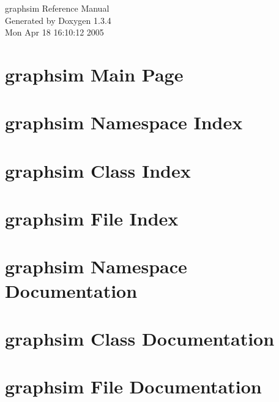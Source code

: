 \documentclass[a4paper]{book}
\begin{document}
\begin{titlepage}
\vspace*{7cm}
\begin{center}
{\Large graphsim Reference Manual}\\
\vspace*{1cm}
{\large Generated by Doxygen 1.3.4}\\
\vspace*{0.5cm}
{\small Mon Apr 18 16:10:12 2005}\\
\end{center}
\end{titlepage}
\clearemptydoublepage
{}
\tableofcontents
\clearemptydoublepage
{}
\chapter{graphsim Main Page}
\label{index}
\chapter{graphsim Namespace Index}

\chapter{graphsim Class Index}

\chapter{graphsim File Index}

\chapter{graphsim Namespace Documentation}

\chapter{graphsim Class Documentation}








\chapter{graphsim File Documentation}



\printindex
\end{document}
